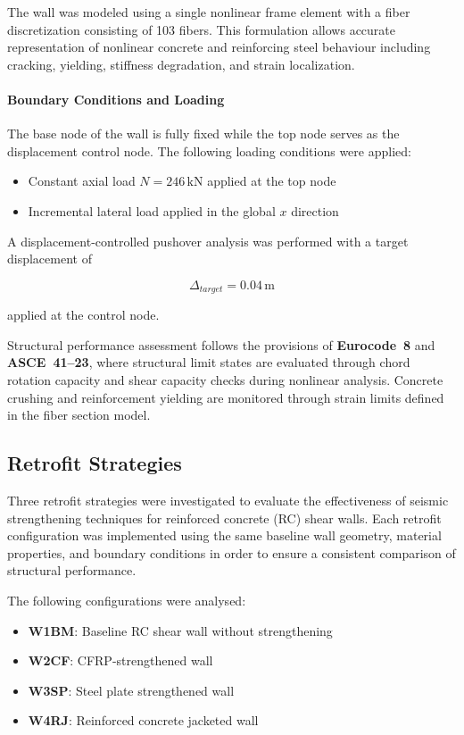 \documentclass[fleqn,10pt]{wlscirep}
\begin{document}
The wall was modeled using a single nonlinear frame element with a fiber discretization consisting of 103 fibers. 
This formulation allows accurate representation of nonlinear concrete and reinforcing steel behaviour including cracking, yielding, stiffness degradation, and strain localization.

\paragraph{Boundary Conditions and Loading}

The base node of the wall is fully fixed while the top node serves as the displacement control node. 
The following loading conditions were applied:

\begin{itemize}
\item Constant axial load $N = 246\,\text{kN}$ applied at the top node
\item Incremental lateral load applied in the global $x$ direction
\end{itemize}

A displacement-controlled pushover analysis was performed with a target displacement of

\[
\Delta_{target} = 0.04\,\text{m}
\]

applied at the control node.

Structural performance assessment follows the provisions of \textbf{Eurocode~8} and \textbf{ASCE~41--23}, where structural limit states are evaluated through chord rotation capacity and shear capacity checks during nonlinear analysis. 
Concrete crushing and reinforcement yielding are monitored through strain limits defined in the fiber section model.

\subsection{Retrofit Strategies}

Three retrofit strategies were investigated to evaluate the effectiveness of seismic strengthening techniques for reinforced concrete (RC) shear walls. 
Each retrofit configuration was implemented using the same baseline wall geometry, material properties, and boundary conditions in order to ensure a consistent comparison of structural performance.

The following configurations were analysed:

\begin{itemize}
\item \textbf{W1BM}: Baseline RC shear wall without strengthening
\item \textbf{W2CF}: CFRP-strengthened wall
\item \textbf{W3SP}: Steel plate strengthened wall
\item \textbf{W4RJ}: Reinforced concrete jacketed wall
\end{itemize}
\end{document}
